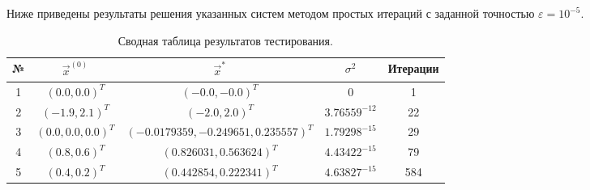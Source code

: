 Ниже приведены результаты решения указанных систем методом простых итераций с заданной точностью $\varepsilon = 10^{-5}$.

\begin{table}[H]
\centering
\begin{tabular}{|c|c|c|c|c|}
\hline
№ & $\vec{x}^{(0)}$ & $\vec{x}^*$ & $\sigma^2$ & Итерации \\ \hline
1 & $(0.0, 0.0)^T$ & $(-0.0, -0.0)^T$ & $0$ & 1 \\ \hline
2 & $(-1.9, 2.1)^T$ & $(-2.0, 2.0)^T$ & $3.76559^{-12}$ & 22 \\ \hline
3 & $(0.0, 0.0, 0.0)^T$ & $(-0.0179359, -0.249651, 0.235557)^T$ & $1.79298^{-15}$ & 29 \\ \hline
4 & $(0.8, 0.6)^T$ & $(0.826031, 0.563624)^T$ & $4.43422^{-15}$ & 79 \\ \hline
5 & $(0.4, 0.2)^T$ & $(0.442854, 0.222341)^T$ & $4.63827^{-15}$ & 584 \\ \hline
\end{tabular}
\caption{Сводная таблица результатов тестирования.}
\end{table}